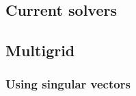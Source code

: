 \documentclass[a4paper,10pt]{article}
\begin{document}
\subsection{Current solvers}\label{sec:mg:solver}





\subsection{Multigrid}\label{sec:mg:mg}


\subsubsection{Using singular vectors}\label{sec:mg:mg:sv}
\end{document}
